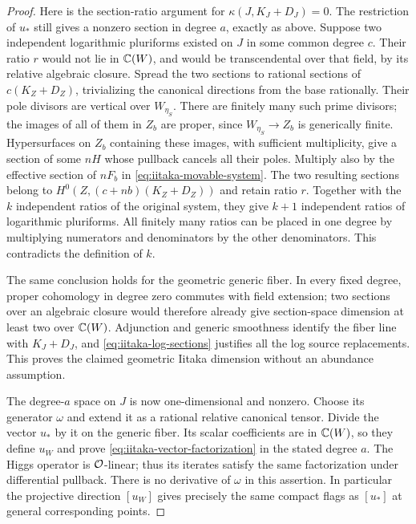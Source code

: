 \begin{proof}
Here is the section-ratio argument for \(\kappa(J,K_J+D_J)=0\).
The restriction of \(u_*\) still gives a nonzero section in degree
\(a\), exactly as above.  Suppose two independent logarithmic
pluriforms existed on \(J\) in some common degree \(c\).
Their ratio \(r\) would not lie in \(\mathbb C(W)\), and would be
transcendental over that field, by its relative algebraic closure.
Spread the two sections to rational sections of
\(c(K_Z+D_Z)\), trivializing the canonical directions from the base
rationally.  Their pole divisors are vertical over \(W_{\eta_S}\).
There are finitely many such prime divisors; the images of all of them
in \(Z_b\) are proper, since \(W_{\eta_S}\to Z_b\) is generically
finite.  Hypersurfaces on \(Z_b\) containing these images, with
sufficient multiplicity, give a section of some \(nH\) whose pullback
cancels all their poles.  Multiply also by the effective section of
\(nF_b\) in \eqref{eq:iitaka-movable-system}.  The two resulting
sections belong to
\(H^0(Z,(c+nb)(K_Z+D_Z))\) and retain ratio \(r\).
Together with the \(k\) independent ratios of the original system,
they give \(k+1\) independent ratios of logarithmic pluriforms.
All finitely many ratios can be placed in one degree by multiplying
numerators and denominators by the other denominators.  This
contradicts the definition of \(k\).

The same conclusion holds for the geometric generic fiber.  In every
fixed degree, proper cohomology in degree zero commutes with field
extension; two sections over an algebraic closure would therefore
already give section-space dimension at least two over \(\mathbb C(W)\).
Adjunction and generic smoothness identify the fiber line with
\(K_J+D_J\), and \eqref{eq:iitaka-log-sections} justifies all the log
source replacements.  This proves the claimed geometric Iitaka
dimension without an abundance assumption.

The degree-\(a\) space on \(J\) is now one-dimensional and nonzero.
Choose its generator \(\omega\) and extend it as a rational relative
canonical tensor.  Divide the vector \(u_*\) by it on the generic
fiber.  Its scalar coefficients are in \(\mathbb C(W)\), so they define
\(u_W\) and prove \eqref{eq:iitaka-vector-factorization} in the stated
degree \(a\).  The Higgs operator is \(\mathcal O\)-linear; thus its iterates
satisfy the same factorization under differential pullback.  There is
no derivative of \(\omega\) in this assertion.  In particular the
projective direction \([u_W]\) gives precisely the same compact flags
as \([u_*]\) at general corresponding points.
\end{proof}

